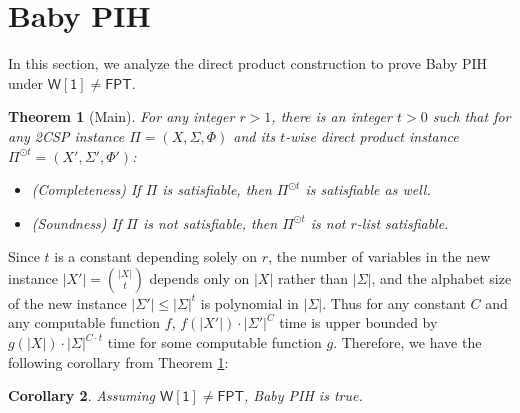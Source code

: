\documentclass[10pt,a4paper]{article}
\newtheorem{theorem}{Theorem}
\newtheorem{corollary}[theorem]{Corollary}
\newcommand{\wone}{\mathsf{W[1]}}
\newcommand{\fpt}{\mathsf{FPT}}
\begin{document}
\section{Baby PIH}
\label{sec:baby}
\noindent In this section, we analyze the direct product construction to prove Baby PIH under $\wone \neq \fpt$.
\begin{theorem}[Main]\label{thm:baby}
    For any integer $r>1$, there is an integer $t>0$ such that for any 2CSP instance $\Pi=(X,\Sigma,\Phi)$ and its $t$-wise direct product instance $\Pi^{\odot t}=(X',\Sigma',\Phi')$:
    \begin{itemize}
        \item (Completeness) If $\Pi$ is satisfiable, then $\Pi^{\odot t}$ is satisfiable as well.
        \item (Soundness) If $\Pi$ is not satisfiable, then $\Pi^{\odot t}$ is not $r$-list satisfiable.
    \end{itemize}
\end{theorem}

Since $t$ is a constant depending solely on $r$, the number of variables in the new instance $|X'|=\binom{|X|}{t}$ depends only on $|X|$ rather than $|\Sigma|$, and the alphabet size of the new instance $|\Sigma'|\le |\Sigma|^t$ is polynomial in $|\Sigma|$. Thus for any constant $C$ and any computable function $f$, $f(|X'|)\cdot |\Sigma'|^{C}$ time is upper bounded by $g(|X|)\cdot |\Sigma|^{C\cdot t}$ time for some computable function $g$. Therefore, we have the following corollary from Theorem \ref{thm:baby}:
\begin{corollary}
    Assuming $\wone\neq\fpt$, Baby PIH is true.
\end{corollary}
\end{document}
